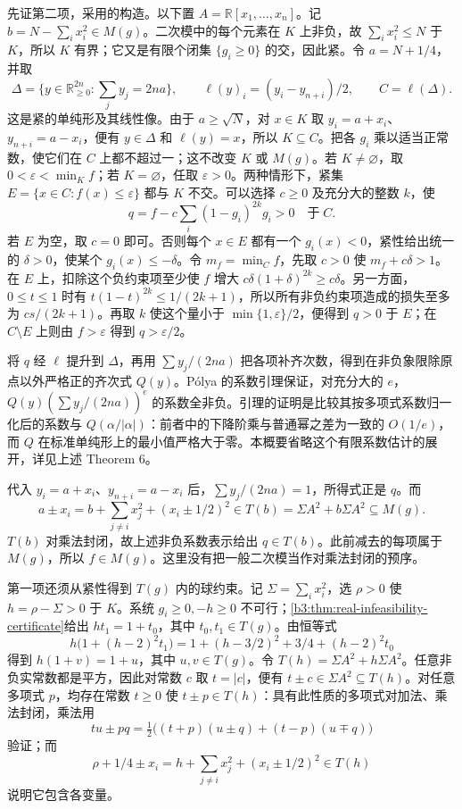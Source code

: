 \begin{proofsketch}
	先证第二项，采用\cite[Section 2, Theorem 6, Lemma 8 and proof of Theorem 3]{Schweighofer2005Optimization}的构造。以下置 \(A=\mathbb R[x_1,\ldots,x_n]\)。记 \(b=N-\sum_i x_i^2\in M(g)\)。二次模中的每个元素在 \(K\) 上非负，故 \(\sum_i x_i^2\le N\) 于 \(K\)，所以 \(K\) 有界；它又是有限个闭集 \(\{g_i\ge0\}\) 的交，因此紧。令 \(a=N+1/4\)，并取
	\[
		\Delta=\{y\in\mathbb R_{\ge0}^{2n}:\textstyle\sum_jy_j=2na\}, \qquad \ell(y)_i=(y_i-y_{n+i})/2, \qquad C=\ell(\Delta).
	\]
	这是紧的单纯形及其线性像。由于 \(a\ge\sqrt N\)，对 \(x\in K\) 取 \(y_i=a+x_i\)、\(y_{n+i}=a-x_i\)，便有 \(y\in\Delta\) 和 \(\ell(y)=x\)，所以 \(K\subseteq C\)。把各 \(g_i\) 乘以适当正常数，使它们在 \(C\) 上都不超过一；这不改变 \(K\) 或 \(M(g)\)。若 \(K\ne\varnothing\)，取 \(0<\varepsilon<\min_Kf\)；若 \(K=\varnothing\)，任取 \(\varepsilon>0\)。两种情形下，紧集 \(E=\{x\in C:f(x)\le\varepsilon\}\) 都与 \(K\) 不交。可以选择 \(c\ge0\) 及充分大的整数 \(k\)，使
	\[
		q=f-c\sum_i(1-g_i)^{2k}g_i>0\quad\text{于}\;C.
	\]
	若 \(E\) 为空，取 \(c=0\) 即可。否则每个 \(x\in E\) 都有一个 \(g_i(x)<0\)，紧性给出统一的 \(\delta>0\)，使某个 \(g_i(x)\le-\delta\)。令 \(m_f=\min_Cf\)，先取 \(c>0\) 使 \(m_f+c\delta>1\)。在 \(E\) 上，扣除这个负约束项至少使 \(f\) 增大 \(c\delta(1+\delta)^{2k}\ge c\delta\)。另一方面，\(0\le t\le1\) 时有 \(t(1-t)^{2k}\le1/(2k+1)\)，所以所有非负约束项造成的损失至多为 \(cs/(2k+1)\)。再取 \(k\) 使这个量小于 \(\min\{1,\varepsilon\}/2\)，便得到 \(q>0\) 于 \(E\)；在 \(C\setminus E\) 上则由 \(f>\varepsilon\) 得到 \(q>\varepsilon/2\)。

	将 \(q\) 经 \(\ell\) 提升到 \(\Delta\)，再用 \(\sum y_j/(2na)\) 把各项补齐次数，得到在非负象限除原点以外严格正的齐次式 \(Q(y)\)。P\'olya 的系数引理保证，对充分大的 \(e\)， \(Q(y)(\sum y_j/(2na))^e\) 的系数全非负。引理的证明是比较其按多项式系数归一化后的系数与 \(Q(\alpha/|\alpha|)\)：前者中的下降阶乘与普通幂之差为一致的 \(O(1/e)\)，而 \(Q\) 在标准单纯形上的最小值严格大于零。本概要省略这个有限系数估计的展开，详见上述 Theorem 6。

	代入 \(y_i=a+x_i\)、\(y_{n+i}=a-x_i\) 后，\(\sum y_j/(2na)=1\)，所得式正是 \(q\)。而
	\[
		a\pm x_i=b+\sum_{j\ne i}x_j^2+(x_i\pm1/2)^2 \in T(b)=\Sigma A^2+b\Sigma A^2\subseteq M(g).
	\]
	\(T(b)\) 对乘法封闭，故上述非负系数表示给出 \(q\in T(b)\)。此前减去的每项属于 \(M(g)\)，所以 \(f\in M(g)\)。这里没有把一般二次模当作对乘法封闭的预序。

	第一项还须从紧性得到 \(T(g)\) 内的球约束。记 \(\Sigma=\sum_i x_i^2\)，选 \(\rho>0\) 使 \(h=\rho-\Sigma>0\) 于 \(K\)。系统 \(g_i\ge0,-h\ge0\) 不可行；\cref{b3:thm:real-infeasibility-certificate}给出 \(h t_1=1+t_0\)，其中 \(t_0,t_1\in T(g)\)。由恒等式
	\[
		h\bigl(1+(h-2)^2t_1\bigr) =1+(h-3/2)^2+3/4+(h-2)^2t_0
	\]
	得到 \(h(1+v)=1+u\)，其中 \(u,v\in T(g)\)。令 \(T(h)=\Sigma A^2+h\Sigma A^2\)。任意非负实常数都是平方，因此对常数 \(c\) 取 \(t=|c|\)，便有 \(t\pm c\in\Sigma A^2\subseteq T(h)\)。对任意多项式 \(p\)，均存在常数 \(t\ge0\) 使 \(t\pm p\in T(h)\)：具有此性质的多项式对加法、乘法封闭，乘法用
	\[
		tu\pm pq=\tfrac12\bigl((t+p)(u\pm q)+(t-p)(u\mp q)\bigr)
	\]
	验证；而
	\[
		\rho+1/4\pm x_i =h+\sum_{j\ne i}x_j^2+(x_i\pm1/2)^2\in T(h)
	\]
	说明它包含各变量。


\end{proofsketch}
